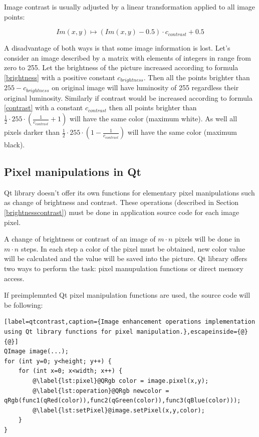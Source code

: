 Image contrast is usually adjusted by a linear transformation applied to all image points:

\begin{equation}
\label{contrast}
  Im(x,y) \longmapsto   (Im(x,y) - 0.5) \cdot c_{contrast} + 0.5
\end{equation}

A disadvantage of both ways is that some image information is lost. Let's consider an image described by a matrix with elements of integers in range from zero to 255. Let the brightness of the picture increased according to formula \eqref{brightness} with a positive constant $ c_{brightness} $. Then all the points brighter than $ 255 - c_{brightness} $ on original image will have luminosity of 255 regardless their original luminosity. Similarly if contrast would be increased according to formula \eqref{contrast} with a constant $ c_{contrast} $ then all points brighter than $ \frac{1}{2} \cdot 255 \cdot (\frac{1}{c_{contrast}}+1) $ will have the same color (maximum white). As well all pixels darker than $ \frac{1}{2} \cdot 255 \cdot (1 - \frac{1}{c_{contrast}}) $ will have the same color (maximum black).


\subsection{Pixel manipulations in Qt}

Qt library doesn't offer its own functions for elementary pixel manipulations such as change of brightness and contrast. These operations (described in Section \ref{brightnesscontrast}) must be done in application source code for each image pixel.

A change of brightness or contrast of an image of $m \cdot n$ pixels will be done in $m \cdot n$ steps. In each step a color of the pixel must be obtained, new color value will be calculated and the value will be saved into the picture. Qt library offers two ways to perform the task: pixel manupulation functions or direct memory access.

If preimplemnted Qt pixel manipulation functions are used, the source code will be following:

\begin{lstlisting}[label=qtcontrast,caption={Image enhancement operations implementation using Qt library functions for pixel manipulation.},escapeinside={@}{@}]
QImage image(...);
for (int y=0; y<height; y++) {
	for (int x=0; x<width; x++) {
		@\label{lst:pixel}@QRgb color = image.pixel(x,y);
		@\label{lst:operation}@QRgb newcolor = qRgb(func1(qRed(color)),func2(qGreen(color)),func3(qBlue(color)));
		@\label{lst:setPixel}@image.setPixel(x,y,color);
	}
}
\end{lstlisting}

